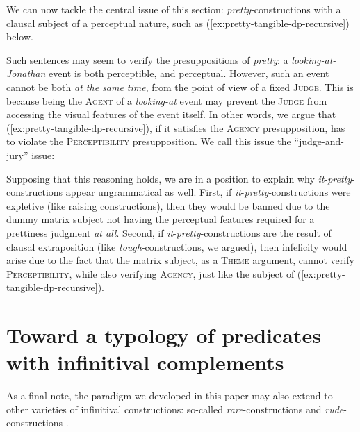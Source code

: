 \documentclass[11pt]{article}
\begin{document}
We can now tackle the central issue of this section: \textit{pretty}-constructions with a clausal subject of a perceptual nature, such as (\ref{ex:pretty-tangible-dp-recursive}) below.
\begin{exe}
	\label{ex:pretty-tangible-dp-recursive}
\end{exe}
Such sentences may seem to verify the presuppositions of \textit{pretty}: a \textit{looking-at-Jonathan} event is both perceptible, and perceptual. However, such an event cannot be both \textit{at the same time}, from the point of view of a fixed \textsc{Judge}. This is because being the \textsc{Agent} of a \textit{looking-at} event may prevent the \textsc{Judge} from accessing the visual features of the event itself. In other words, we argue that (\ref{ex:pretty-tangible-dp-recursive}), if it satisfies the \textsc{Agency} presupposition, has to violate the \textsc{Perceptibility} presupposition. We call this issue the ``judge-and-jury'' issue:

\begin{center}
\end{center}



Supposing that this reasoning holds, we are in a position to explain why \textit{it}-\textit{pretty}-constructions appear ungrammatical as well. First, if \textit{it}-\textit{pretty}-constructions were expletive (like raising constructions), then they would be banned due to the dummy matrix subject not having the perceptual features required for a prettiness judgment \textit{at all}. Second, if \textit{it}-\textit{pretty}-constructions are the result of clausal extraposition (like \textit{tough}-constructions, we argued), then infelicity would arise due to the fact that the matrix subject, as a \textsc{Theme} argument, cannot verify \textsc{Perceptibility}, while also verifying \textsc{Agency}, just like the subject of (\ref{ex:pretty-tangible-dp-recursive}).

\section{Toward a typology of predicates with infinitival complements}\label{sec:conclusion}		
	 As a final note, the paradigm we developed in this paper may also extend to other varieties of infinitival constructions: so-called \textit{rare}-constructions \cite{Fleisher2015} and \textit{rude}-constructions \cite{Stowell1991, Bennis2000, Bennis2004, Landau2006, Landau2009}.
\end{document}
